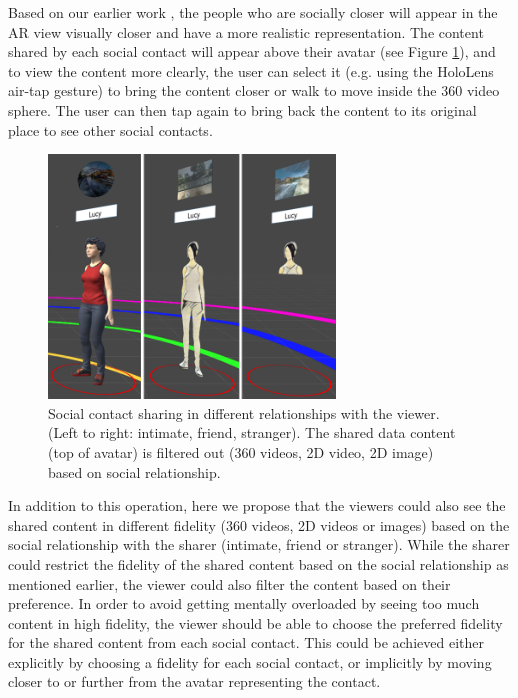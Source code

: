 Based on our earlier work \cite{Nassani2017a}, the people who are socially closer will appear in the AR view visually closer and have a more realistic representation. The content shared by each social contact will appear above their avatar (see Figure \ref{fig:data:viewer}), and to view the content more clearly, the user can select it (e.g. using the HoloLens air-tap gesture) to bring the content closer or walk to move inside the 360 video sphere. The user can then tap again to bring back the content to its original place to see other social contacts. 

\begin{figure}[ht]
    \centering
    \includegraphics[width=3in]{images/chi/3_levels_of_data.png}
    \caption{Social contact sharing in different relationships with the viewer. (Left to right: intimate, friend, stranger). The shared data content (top of avatar) is filtered out (360 videos, 2D video, 2D image) based on social relationship.}
      \label{fig:data:viewer}
\end{figure}

In addition to this operation, here we propose that the viewers could also see the shared content in different fidelity (360 videos, 2D videos or images) based on the social relationship with the sharer (intimate, friend or stranger). While the sharer could restrict the fidelity of the shared content based on the social relationship as mentioned earlier, the viewer could also filter the content based on their preference. In order to avoid getting mentally overloaded by seeing too much content in high fidelity, the viewer should be able to choose the preferred fidelity for the shared content from each social contact. This could be achieved either explicitly by choosing a fidelity for each social contact, or implicitly by moving closer to or further from the avatar representing the contact.      

